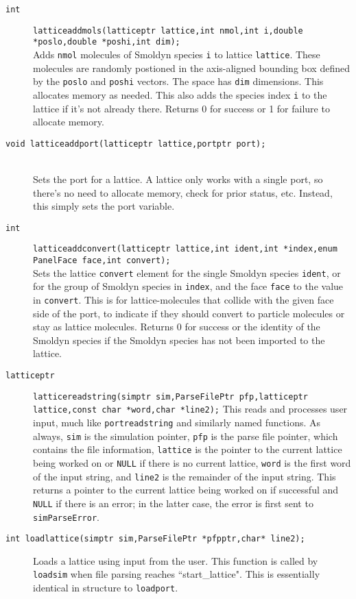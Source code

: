 \documentclass {scrbook}
\newcommand {\ttt} {\texttt}
\begin{document}
\begin{description}
\item[\ttt{int}]
\ttt{latticeaddmols(latticeptr lattice,int nmol,int i,double *poslo,double *poshi,int dim);}
\hfill \\
Adds \ttt{nmol} molecules of Smoldyn species \ttt{i} to lattice \ttt{lattice}. These molecules are randomly postioned in the axis-aligned bounding box defined by the \ttt{poslo} and \ttt{poshi} vectors. The space has \ttt{dim} dimensions. This allocates memory as needed. This also adds the species index \ttt{i} to the lattice if it's not already there. Returns 0 for success or 1 for failure to allocate memory.

\item[\ttt{void latticeaddport(latticeptr lattice,portptr port);}]
\hfill \\
Sets the port for a lattice. A lattice only works with a single port, so there's no need to allocate memory, check for prior status, etc. Instead, this simply sets the port variable.

\item[\ttt{int}]
\ttt{latticeaddconvert(latticeptr lattice,int ident,int *index,enum PanelFace face,int convert);}
\hfill \\
Sets the lattice \ttt{convert} element for the single Smoldyn species \ttt{ident}, or for the group of Smoldyn species in \ttt{index}, and the face \ttt{face} to the value in \ttt{convert}. This is for lattice-molecules that collide with the given face side of the port, to indicate if they should convert to particle molecules or stay as lattice molecules. Returns 0 for success or the identity of the Smoldyn species if the Smoldyn species has not been imported to the lattice.

\item[\ttt{latticeptr}]
\ttt{latticereadstring(simptr sim,ParseFilePtr pfp,latticeptr lattice,const char *word,char *line2);}
This reads and processes user input, much like \ttt{portreadstring} and similarly named functions. As always, \ttt{sim} is the simulation pointer, \ttt{pfp} is the parse file pointer, which contains the file information, \ttt{lattice} is the pointer to the current lattice being worked on or \ttt{NULL} if there is no current lattice, \ttt{word} is the first word of the input string, and \ttt{line2} is the remainder of the input string. This returns a pointer to the current lattice being worked on if successful and \ttt{NULL} if there is an error; in the latter case, the error is first sent to \ttt{simParseError}. 

\item[\ttt{int loadlattice(simptr sim,ParseFilePtr *pfpptr,char* line2);}]
Loads a lattice using input from the user. This function is called by \ttt{loadsim} when file parsing reaches ``start\_lattice". This is essentially identical in structure to \ttt{loadport}.


\end{description}
\end{document}

